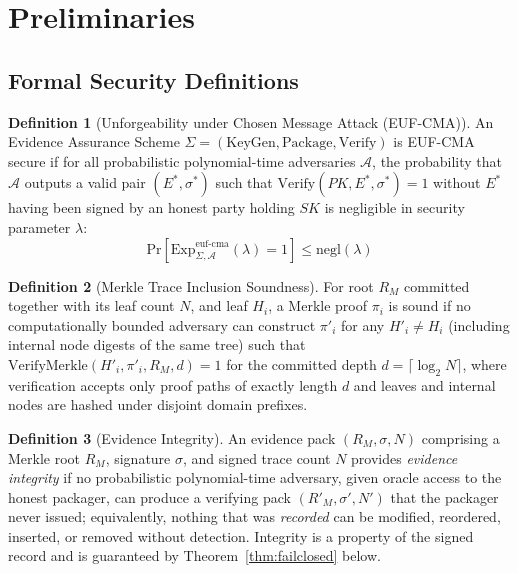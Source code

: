 \documentclass[letterpaper,10pt,twocolumn]{article}
\theoremstyle{definition}
\newtheorem{definition}{Definition}
\begin{document}
\section{Preliminaries}\label{sec:preliminaries}
\subsection{Formal Security Definitions}

\begin{definition}[Unforgeability under Chosen Message Attack (EUF-CMA)]
An Evidence Assurance Scheme $\Sigma = (\text{KeyGen}, \text{Package}, \text{Verify})$ is EUF-CMA secure if for all probabilistic polynomial-time adversaries $\mathcal{A}$, the probability that $\mathcal{A}$ outputs a valid pair $(E^*, \sigma^*)$ such that $\text{Verify}(PK, E^*, \sigma^*) = 1$ without $E^*$ having been signed by an honest party holding $SK$ is negligible in security parameter $\lambda$:
\begin{equation}
\text{Pr}[\text{Exp}_{\Sigma, \mathcal{A}}^{\text{euf-cma}}(\lambda) = 1] \le \text{negl}(\lambda)
\end{equation}
\end{definition}

\begin{definition}[Merkle Trace Inclusion Soundness]
For root $R_M$ committed together with its leaf count $N$, and leaf $H_i$, a Merkle proof $\pi_i$ is sound if no computationally bounded adversary can construct $\pi'_i$ for any $H'_i \neq H_i$  (including internal node digests of the same tree)  such that $\text{VerifyMerkle}(H'_i, \pi'_i, R_M, d) = 1$ for the committed depth $d = \lceil\log_2 N\rceil$, where verification accepts only proof paths of exactly length $d$ and leaves and internal nodes are hashed under disjoint domain prefixes.
\end{definition}

\begin{definition}[Evidence Integrity]\label{def:integrity}
An evidence pack $(R_M, \sigma, N)$ comprising a Merkle root $R_M$, signature $\sigma$, and signed trace count $N$ provides \emph{evidence integrity} if no probabilistic polynomial-time adversary, given oracle access to the honest packager, can produce a verifying pack $(R'_M, \sigma', N')$ that the packager never issued; equivalently, nothing that was \emph{recorded} can be modified, reordered, inserted, or removed without detection. Integrity is a property of the signed record and is guaranteed by Theorem~\ref{thm:failclosed} below.
\end{definition}
\end{document}
